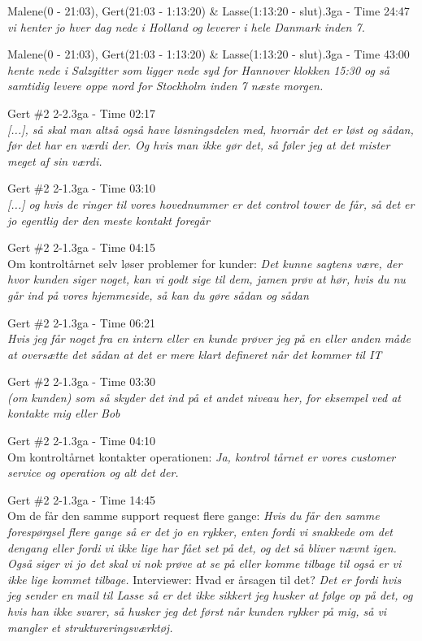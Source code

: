 \begin{thebibliography}{9}

	Malene(0 - 21:03), Gert(21:03 - 1:13:20) \& Lasse(1:13:20 - slut).3ga - Time 24:47\\
	\textit{vi henter jo hver dag nede i Holland og leverer i hele Danmark inden 7.}

	Malene(0 - 21:03), Gert(21:03 - 1:13:20) \& Lasse(1:13:20 - slut).3ga - Time 43:00\\
\textit{hente nede i Salzgitter som ligger nede syd for Hannover klokken 15:30 og så samtidig levere oppe nord for Stockholm inden 7 næste morgen.}

	Gert \#2 2-2.3ga - Time 02:17\\
	\textit{[...], så skal man altså også have løsningsdelen med, hvornår det er løst og sådan, før det har en værdi der. Og hvis man ikke gør det, så føler jeg at det mister meget af sin værdi.}

Gert \#2 2-1.3ga - Time 03:10\\
	\textit{[...] og hvis de ringer til vores hovednummer er det control tower de får, så det er jo egentlig der den meste kontakt foregår}

	Gert \#2 2-1.3ga - Time 04:15\\
	Om kontroltårnet selv løser problemer for kunder: \textit{Det kunne sagtens være, der hvor kunden siger noget, kan vi godt sige til dem, jamen prøv at hør, hvis du nu går ind på vores hjemmeside, så kan du gøre sådan og sådan}

Gert \#2 2-1.3ga - Time 06:21\\
	\textit{Hvis jeg får noget fra en intern eller en kunde prøver jeg på en eller anden måde at oversætte det sådan at det er mere klart defineret når det kommer til IT}

	Gert \#2 2-1.3ga - Time 03:30\\
	\textit{(om kunden) som så skyder det ind på et andet niveau her, for eksempel ved at kontakte mig eller Bob}

	Gert \#2 2-1.3ga - Time 04:10\\
	Om kontroltårnet kontakter operationen: 
	\textit{Ja, kontrol tårnet er vores customer service og operation og alt det der.}

	Gert \#2 2-1.3ga - Time 14:45\\
	Om de får den samme support request flere gange: \textit{Hvis du får den samme forespørgsel flere gange så er det jo en rykker, enten fordi vi snakkede om det dengang eller fordi vi ikke lige har fået set på det, og det så bliver nævnt igen. Også siger vi jo det skal vi nok prøve at se på eller komme tilbage til også er vi ikke lige kommet tilbage.} Interviewer: Hvad er årsagen til det? \textit{Det er fordi hvis jeg sender en mail til Lasse så er det ikke sikkert jeg husker at følge op på det, og hvis han ikke svarer, så husker jeg det først når kunden rykker på mig, så vi mangler et struktureringsværktøj. } 


\end{thebibliography}
